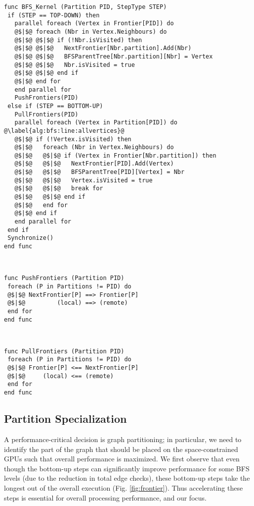\documentclass{llncs}
\begin{document}
\begin{minipage}{\textwidth}
\label{alg:bfs}
\begin{minipage}{0.60\textwidth}
\begin{lstlisting}
func BFS_Kernel (Partition PID, StepType STEP)
 if (STEP == TOP-DOWN) then
   parallel foreach (Vertex in Frontier[PID]) do
   @$|$@ foreach (Nbr in Vertex.Neighbours) do
   @$|$@ @$|$@ if (!Nbr.isVisited) then
   @$|$@ @$|$@   NextFrontier[Nbr.partition].Add(Nbr)
   @$|$@ @$|$@   BFSParentTree[Nbr.partition][Nbr] = Vertex
   @$|$@ @$|$@   Nbr.isVisited = true
   @$|$@ @$|$@ end if
   @$|$@ end for
   end parallel for
   PushFrontiers(PID)
 else if (STEP == BOTTOM-UP) 
   PullFrontiers(PID)
   parallel foreach (Vertex in Partition[PID]) do  @\label{alg:bfs:line:allvertices}@
   @$|$@ if (!Vertex.isVisited) then
   @$|$@   foreach (Nbr in Vertex.Neighbours) do
   @$|$@   @$|$@ if (Vertex in Frontier[Nbr.partition]) then
   @$|$@   @$|$@   NextFrontier[PID].Add(Vertex)
   @$|$@   @$|$@   BFSParentTree[PID][Vertex] = Nbr
   @$|$@   @$|$@   Vertex.isVisited = true
   @$|$@   @$|$@   break for
   @$|$@   @$|$@ end if
   @$|$@   end for
   @$|$@ end if
   end parallel for
 end if
 Synchronize()
end func
\end{lstlisting}
\end{minipage}
\begin{minipage}{.39\textwidth}
 \newline
{}
\label{alg:scatter}
\begin{lstlisting}
func PushFrontiers (Partition PID)
 foreach (P in Partitions != PID) do
 @$|$@ NextFrontier[P] ==> Frontier[P]
 @$|$@         (local) ==> (remote)
 end for
end func
\end{lstlisting}
 \newline
 \newline
 \newline
{}
\label{alg:gather}
\begin{lstlisting}
func PullFrontiers (Partition PID)
 foreach (P in Partitions != PID) do
 @$|$@ Frontier[P] <== NextFrontier[P]
 @$|$@     (local) <== (remote)
 end for
end func
\end{lstlisting}
\end{minipage}
\end{minipage}
\subsection{Partition Specialization}\label{sec:partitioning}A performance-critical decision is graph partitioning; in particular, we need to identify the part of the graph that should be placed on the space-constrained GPUs such that overall performance is maximized. We first observe that even though the bottom-up steps can significantly improve performance for some BFS levels (due to the reduction in total edge checks), these bottom-up steps  take the longest out of the overall execution (Fig. \ref{fig:frontier}). Thus accelerating these steps is essential for overall processing performance, and our focus.
\end{document}
